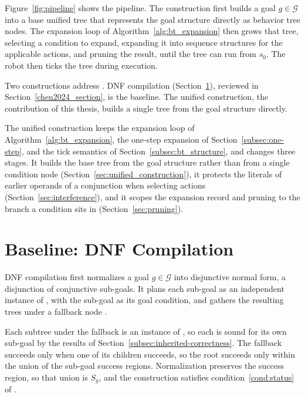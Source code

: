     
    Figure~\ref{fig:pipeline} shows the pipeline.
    The construction first builds a goal $g \in \mathcal{G}$ into a base unified tree that represents the goal structure directly as behavior tree nodes.
    The expansion loop of Algorithm~\ref{alg:bt_expansion} then grows that tree, selecting a condition to expand, expanding it into sequence structures for the applicable actions, and pruning the result, until the tree can run from $s_0$.
    The robot then ticks the tree during execution.
    
    Two constructions address \probprime.
    DNF compilation (Section~\ref{sec:dnf_compilation}), reviewed in Section~\ref{chen2024_section}, is the baseline.
    The unified construction, the contribution of this thesis, builds a single tree from the goal structure directly.

    The unified construction keeps the expansion loop of Algorithm~\ref{alg:bt_expansion}, the one-step expansion of Section~\ref{subsec:one-step}, and the tick semantics of Section~\ref{subsec:bt_structure}, and changes three stages.
    It builds the base tree from the goal structure rather than from a single condition node (Section~\ref{sec:unified_construction}), it protects the literals of earlier operands of a conjunction when selecting actions (Section~\ref{sec:interference}), and it scopes the expansion record and pruning to the branch a condition sits in (Section~\ref{sec:pruning}).

\section{Baseline: DNF Compilation}
\label{sec:dnf_compilation}
    DNF compilation first normalizes a goal $g \in \mathcal{G}$ into disjunctive normal form, a disjunction of conjunctive sub-goals.
    It plans each sub-goal as an independent instance of \probone, with the sub-goal as its goal condition, and gathers the resulting trees under a fallback node \cite{chen2024}.

    

    Each subtree under the fallback is an instance of \probone, so each is sound for its own sub-goal by the results of Section~\ref{subsec:inherited-correctness}.
    The fallback succeeds only when one of its children succeeds, so the root succeeds only within the union of the sub-goal success regions.
    Normalization preserves the success region, so that union is $S_g$, and the construction satisfies condition~\ref{cond:status} of \probprime.

